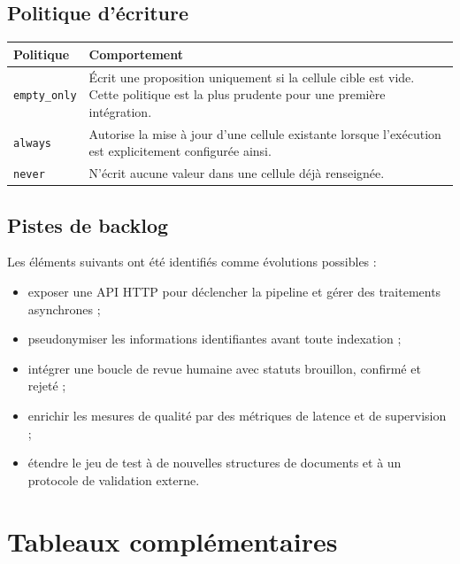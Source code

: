 \section{Politique d'écriture}
\begin{longtable}{p{}p{}}
\toprule
Politique & Comportement\\
\midrule
\texttt{empty\_only} & Écrit une proposition uniquement si la cellule cible est vide. Cette politique est la plus prudente pour une première intégration.\\
\texttt{always} & Autorise la mise à jour d'une cellule existante lorsque l'exécution est explicitement configurée ainsi.\\
\texttt{never} & N'écrit aucune valeur dans une cellule déjà renseignée.\\
\bottomrule
\end{longtable}

\section{Pistes de backlog}
Les éléments suivants ont été identifiés comme évolutions possibles :
\begin{itemize}
  \item exposer une API HTTP pour déclencher la pipeline et gérer des traitements asynchrones ;
  \item pseudonymiser les informations identifiantes avant toute indexation ;
  \item intégrer une boucle de revue humaine avec statuts brouillon, confirmé et rejeté ;
  \item enrichir les mesures de qualité par des métriques de latence et de supervision ;
  \item étendre le jeu de test à de nouvelles structures de documents et à un protocole de validation externe.
\end{itemize}

\chapter{Tableaux complémentaires}
